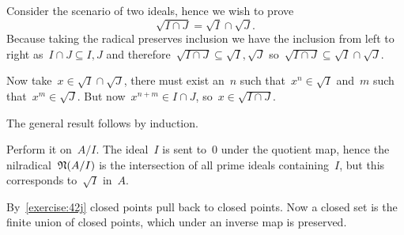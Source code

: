 \begin{exercise}
  Consider the scenario of two ideals, hence we wish to prove
  \begin{equation}
    \sqrt{I\cap J}=\sqrt{I}\cap\sqrt{J}.
  \end{equation}
  Because taking the radical preserves inclusion we have the inclusion from left to right as~$I\cap J\subseteq I,J$ and therefore~$\sqrt{I\cap J}\subseteq\sqrt{I},\sqrt{J}$ so~$\sqrt{I\cap J}\subseteq\sqrt{I}\cap\sqrt{J}$.
  
  Now take~$x\in\sqrt{I}\cap\sqrt{J}$, there must exist an~$n$ such that~$x^n\in\sqrt{I}$ and~$m$ such that~$x^m\in\sqrt{J}$. But now~$x^{n+m}\in I\cap J$, so~$x\in\sqrt{I\cap J}$.

  The general result follows by induction.
\end{exercise}

\begin{exercise}
  \label{exercise:44f}
  Perform it on~$A/I$. The ideal~$I$ is sent to~$0$ under the quotient map, hence the nilradical~$\mathfrak{N}(A/I)$ is the intersection of all prime ideals containing~$I$, but this corresponds to~$\sqrt{I}$ in~$A$.
\end{exercise}

\begin{exercise}
  By~\autoref{exercise:42j} closed points pull back to closed points. Now a closed set is the finite union of closed points, which under an inverse map is preserved.
\end{exercise}

